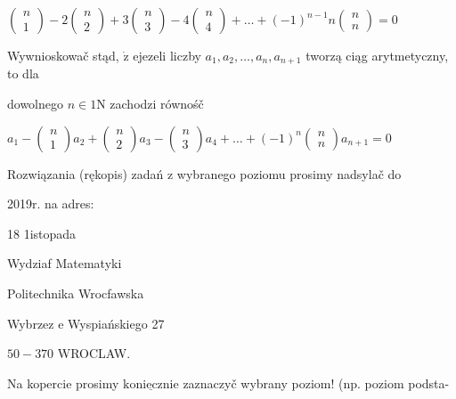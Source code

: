 \documentclass[a4paper,12pt]{article}
\begin{document}
$\left(\begin{array}{l}
n\\
1
\end{array}\right)-2\left(\begin{array}{l}
n\\
2
\end{array}\right)+3\left(\begin{array}{l}
n\\
3
\end{array}\right)-4\left(\begin{array}{l}
n\\
4
\end{array}\right)+\ldots+(-1)^{n-1}n\left(\begin{array}{l}
n\\
n
\end{array}\right)=0$

Wywnioskowač stąd, $\dot{\mathrm{z}}$ ejezeli liczby $a_{1}, a_{2}, \ldots, a_{n}, a_{n+1}$ tworzą ciąg arytmetyczny, to dla

dowolnego $n\in 1\mathrm{N}$ zachodzi równośč

$a_{1}-\left(\begin{array}{l}
n\\
1
\end{array}\right)a_{2}+\left(\begin{array}{l}
n\\
2
\end{array}\right)a_{3}-\left(\begin{array}{l}
n\\
3
\end{array}\right)a_{4}+\ldots+(-1)^{n}\left(\begin{array}{l}
n\\
n
\end{array}\right)a_{n+1}=0$

Rozwiązania (rękopis) zadań z wybranego poziomu prosimy nadsylač do

2019r. na adres:

18 1istopada

Wydziaf Matematyki

Politechnika Wrocfawska

Wybrzez $\mathrm{e}$ Wyspiańskiego 27

$50-370$ WROCLAW.

Na kopercie prosimy $\underline{\mathrm{k}\mathrm{o}\mathrm{n}\mathrm{i}\mathrm{e}\mathrm{c}\mathrm{z}\mathrm{n}\mathrm{i}\mathrm{e}}$ zaznaczyč wybrany poziom! (np. poziom podsta-
\end{document}
